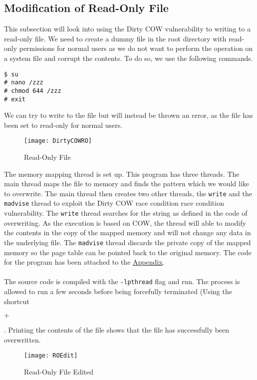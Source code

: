 \documentclass[a4paper,12pt]{article}
\begin{document}
\subsection{Modification of Read-Only File}\label{task1}
This subsection will look into using the Dirty COW vulnerability to writing to a read-only file. We need to create a dummy file in the root directory with read-only permissions for normal users as we do not want to perform the operation on a system file and corrupt the contents. To do so, we use the following commands.
\begin{verbatim}
$ su
# nano /zzz
# chmod 644 /zzz
# exit
\end{verbatim}
We can try to write to the file but will instead be thrown an error, as the file has been set to read-only for normal users.
\begin{figure}[H]
	\centering
	\texttt{[image: DirtyCOWRO]}
	\caption{Read-Only File}
	\label{fig:dirtycowro}
\end{figure}
\noindent The memory mapping thread is set up. This program has three threads. The main thread maps the file to memory and finds the pattern which we would like to overwrite. The main thread then creates two other threads, the \texttt{write} and the \texttt{madvise} thread to exploit the Dirty COW race condition race condition vulnerability. The \texttt{write} thread searches for the string as defined in the code of overwriting. As the execution is based on COW, the thread will able to modify the contents in the copy of the mapped memory and will not change any data in the underlying file. The \texttt{madvise} thread discards the private copy of the mapped memory so the page table can be pointed back to the original memory. The code for the program has been attached to the \hyperref[Appsec:2]{Appendix}. \\\\The source code is compiled with the \texttt{-lpthread} flag and run. The process is allowed to run a few seconds before being forcefully terminated (Using the shortcut  $+$ . Printing the contents of the file shows that the file has successfully been overwritten.
\begin{figure}[H]
	\centering
	\texttt{[image: ROEdit]}
	\caption{Read-Only File Edited}
	\label{fig:roedit}
\end{figure}
\end{document}
